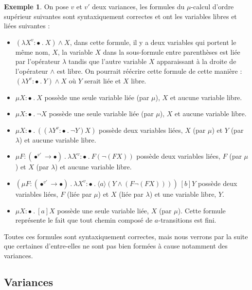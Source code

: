 \documentclass{rapport}
\theoremstyle{plain}
\theoremstyle{remark}
\theoremstyle{definition}
\newtheorem{exem}{Exemple}
\begin{document}
\begin{exem}\label{exemple1}
On pose $v$ et $v'$ deux variances, les formules du $\mu$-calcul d'ordre supérieur suivantes sont syntaxiquement correctes et ont les variables libres et liées suivantes :
\begin{itemize}
	\item $(\lambda X^{v} : \bullet \ . \ X) \wedge X$, dans cette formule, il y a deux variables qui portent le même nom, $X$, la variable $X$ dans la sous-formule entre parenthèses est liée par l'opérateur $\lambda$ tandis que l'autre variable $X$ apparaissant à la droite de l'opérateur $\wedge$ est libre. On pourrait réécrire cette formule de cette manière : $(\lambda Y^{v} : \bullet \ . \ Y) \wedge X$ où $Y$ serait liée et $X$ libre. 
	\item $\mu X : \bullet \ . \  X$ possède une seule variable liée (par $\mu$), $X$ et aucune variable libre.
	\item $\mu X : \bullet \ . \  \neg X$ possède une seule variable liée (par $\mu$), $X$ et aucune variable libre.
	\item $\mu X : \bullet \ . \  ((\lambda Y^{v} : \bullet \ . \ \neg Y)X)$ possède deux variables liées, $X$ (par $\mu$) et $Y$ (par $\lambda$) et aucune variable libre.
	\item $\mu F : (\bullet^{v'} \rightarrow \bullet) \ . \  \lambda X^{v} : \bullet \ . \ F (\neg (F X))$ possède deux variables liées, $F$ (par $\mu$) et $X$ (par $\lambda$) et aucune variable libre.
	\item $(\mu F : (\bullet^{v'} \rightarrow \bullet) \ . \ \lambda X^{v} : \bullet \ . \ \langle a \rangle (Y \wedge (F \neg(F X)))) \ [b] Y$ possède deux variables liées, $F$ (liée par $\mu$) et $X$ (liée par $\lambda$) et une variable libre, $Y$.
	\item $\mu X : \bullet \ . \ [a]X$ possède une seule variable liée, $X$ (par $\mu$). Cette formule représente le fait que tout chemin composé de $a$-transitions est fini.
\end{itemize}

Toutes ces formules sont syntaxiquement correctes, mais nous verrons par la suite que certaines d'entre-elles ne sont pas bien formées à cause notamment des variances. 
\end{exem}

\subsection{Variances\label{sec:variances}}
\end{document}
